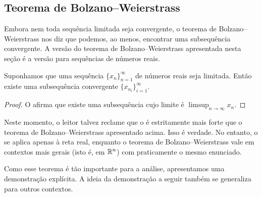 \subsection{Teorema de Bolzano--Weierstrass}

Embora nem toda sequência limitada seja convergente, o
teorema de Bolzano--Weierstrass nos diz que podemos, ao menos, encontrar uma subsequência
convergente.
A versão do teorema de Bolzano--Weierstrass
apresentada nesta seção é a versão para
sequências de números reais.

\begin{thm}\label{thm:bwseq}
Suponhamos que uma sequência $\{ x_n \}_{n=1}^\infty$ de números reais seja limitada.
Então existe uma subsequência convergente $\{ x_{n_i} \}_{i=1}^\infty$.
\end{thm}

\begin{proof}
O  afirma que existe
uma subsequência cujo limite é $\limsup_{n\to\infty} x_n$.
\end{proof}

Neste momento, o leitor talvez reclame que
o  é estritamente mais forte que o
teorema de Bolzano--Weierstrass apresentado acima. Isso é verdade.
No entanto,
o  se aplica apenas à reta real, enquanto
o teorema de Bolzano--Weierstrass vale em contextos mais gerais (isto é, em ${\mathbb{R}}^n$)
com praticamente o mesmo enunciado.

Como esse teorema é tão importante para a análise, apresentamos uma demonstração
explícita.
A ideia da demonstração a seguir também se generaliza para outros contextos.

